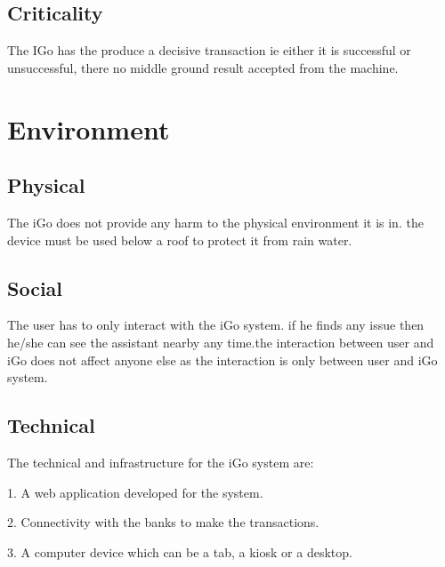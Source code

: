 \documentclass[12pt]{report}
\begin{document}
\subsection{Criticality}

The IGo has the produce a decisive transaction ie either it is successful or unsuccessful, there no middle ground result accepted from the machine.\par



\vspace{\baselineskip}
\section{Environment}

\subsection{Physical}

The iGo does not provide any harm to the physical environment it is in. the device must be used below a roof to protect it from rain water.\par


\vspace{\baselineskip}
\subsection{Social}

The user has to only interact with the iGo system. if he finds any issue then he/she can see the assistant nearby any time.the interaction between user and iGo does not affect anyone else as the interaction is only between user and iGo system.\par


\vspace{\baselineskip}
\subsection{Technical}

The technical and infrastructure for the iGo system are:\par

1. A web application developed for the system.\par

2. Connectivity with the banks to make the transactions.\par

3. A computer device which can be a tab, a kiosk or a desktop.\par
\end{document}
